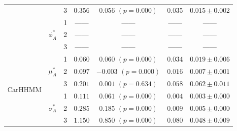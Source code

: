 \documentclass{article}
\begin{document}
\begin{center}
{\begin{tabular}{ccccccc}
                            &                               & 3                                & $0.356$                         & $0.056$ $(p=0.000)$          & $0.035$                             & $0.015 \pm 0.002$                             \\
                            & \multirow{3}{*}{$\phi_A^*$}   & 1                                & ------                         & ------                     & ------                             & ------                                      \\
                            &                               & 2                                & ------                         & ------                     & ------                             & ------                                      \\
                            &                               & 3                                & ------                         & ------                     & ------                             & ------                                      \\ \hline
\multirow{9}{*}{CarHHMM}    & \multirow{3}{*}{$\mu_A^*$}    & 1                                & $0.060$                         & $0.060$ $(p=0.000)$          & $0.034$                             & $0.019 \pm 0.006$                             \\
                            &                               & 2                                & $0.097$                         & $-0.003$ $(p=0.000)$          & $0.016$                             & $0.007 \pm 0.001$                             \\
                            &                               & 3                                & $0.201$                         & $0.001$ $(p=0.634)$          & $0.058$                             & $0.062 \pm 0.011$                             \\
                            & \multirow{3}{*}{$\sigma_A^*$} & 1                                & $0.111$                         & $0.061$ $(p=0.000)$          & $0.004$                             & $0.003 \pm 0.000$                             \\
                            &                               & 2                                & $0.285$                         & $0.185$ $(p=0.000)$          & $0.009$                             & $0.005 \pm 0.000$                             \\ 
                            &                               & 3                                & $1.150$                         & $0.850$ $(p=0.000)$          & $0.080$                             & $0.048 \pm 0.009$                             \\

\end{tabular}}
\end{center}
\end{document}

